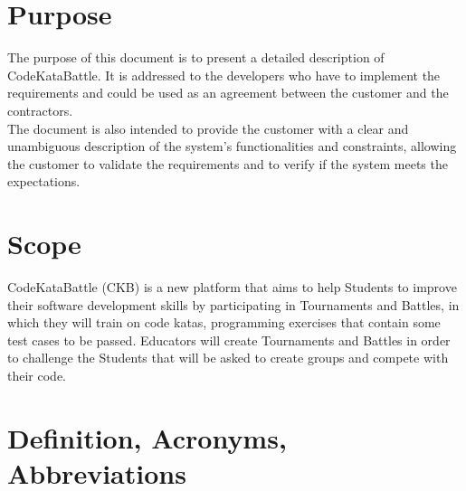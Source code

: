 \section{Purpose}
\label{sec:purpose}%
The purpose of this document is to present a detailed description of CodeKataBattle.
It is addressed to the developers who have to implement the requirements and could be used as an agreement between the customer and the contractors.\\ 
The document is also intended to provide the customer with a clear and unambiguous description of the system's functionalities and constraints, allowing the customer to validate the requirements and to verify if the system meets the expectations.

\section{Scope}
\label{sec:scope}%
CodeKataBattle (CKB) is a new platform that aims to help Students to improve their software development skills by participating in Tournaments and Battles, in which they will train on code katas, programming exercises that contain some test cases to be passed. Educators will create Tournaments and Battles in order to challenge the Students that will be asked to create groups and compete with their code.

\section{Definition, Acronyms, Abbreviations}
\label{sec:definition_acronyms_abbreviations}%

